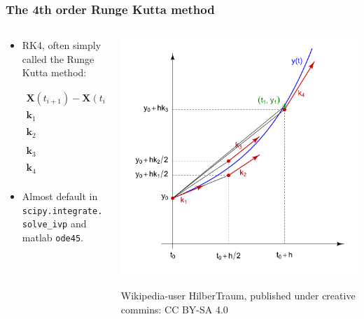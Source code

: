 \documentclass{beamer}
\begin{document}
\begin{frame}
\frametitle{The 4th order Runge Kutta method}
\begin{columns}
\begin{column}{0.5\linewidth}
\begin{itemize}

\item<1-> RK4, often simply called the Runge Kutta method:

\begin{align*}
\mathbf{X}(t_{i+1})-\mathbf{X}(t_{i}) &= \frac{h}{6}(\mathbf{k}_1+2\mathbf{k}_2+2\mathbf{k}_3+\mathbf{k}_4 )\\
\mathbf{k}_1 &= f_{ode}(\mathbf{X}(t_i),t_i)\\
\mathbf{k}_2 &= f_{ode}(\mathbf{X}(t_i)+\frac{h}{2}\mathbf{k}_1,t_i+\frac{h}{2})\\
\mathbf{k}_3 &= f_{ode}(\mathbf{X}(t_i)+\frac{h}{2}\mathbf{k}_2,t_i+\frac{h}{2})\\
\mathbf{k}_4 &= f_{ode}(\mathbf{X}(t_i)+h\mathbf{k}_3,t_i+h)\\
\end{align*}

\item<2-> Almost default in \lstinline{scipy.integrate.solve_ivp} and matlab \lstinline{ode45}.

\end{itemize}
\end{column}
\begin{column}{0.5\linewidth}
\includegraphics[width=\linewidth]{Runge-Kutta_slopes.pdf}

{\color{gray} Wikipedia-user HilberTraum, published under creative commins: CC BY-SA 4.0}
\end{column}
\end{columns}
\end{frame}
\end{document}
